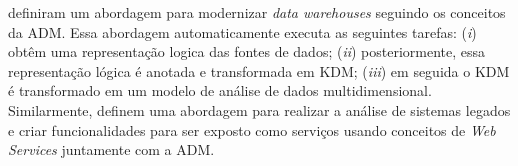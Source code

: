 


 definiram um abordagem para modernizar \textit{data warehouses} seguindo os conceitos da ADM. Essa abordagem automaticamente executa as seguintes tarefas: (\textit{i}) obtêm uma representação logica das fontes de dados; (\textit{ii}) posteriormente, essa representação lógica é anotada e transformada em KDM; (\textit{iii}) em seguida o KDM é transformado em um modelo de análise de dados multidimensional. Similarmente,  definem uma abordagem para realizar a análise de sistemas legados e criar funcionalidades para ser exposto como serviços usando conceitos de \textit{Web Services} juntamente com a ADM.




